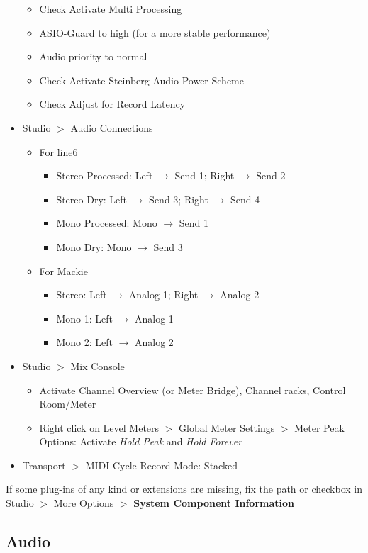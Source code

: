 \documentclass[10pt]{article}
\begin{document}
\begin{itemize}
\begin{itemize}
		\item Check Activate Multi Processing
		\item ASIO-Guard to high (for a more stable performance)
		\item Audio priority to normal
		\item Check Activate Steinberg Audio Power Scheme
		\item Check Adjust for Record Latency
	\end{itemize}
	\item Studio $>$ Audio Connections
	\begin{itemize}
		\item For line6
		\begin{itemize}
			\item Stereo Processed: Left $\rightarrow$ Send 1; Right $\rightarrow$ Send 2
			\item Stereo Dry: Left $\rightarrow$ Send 3; Right $\rightarrow$ Send 4
			\item Mono Processed: Mono $\rightarrow$ Send 1
			\item Mono Dry: Mono $\rightarrow$ Send 3
		\end{itemize}
		\item For Mackie
		\begin{itemize}
			\item Stereo: Left $\rightarrow$ Analog 1; Right $\rightarrow$ Analog 2
			\item Mono 1: Left $\rightarrow$ Analog 1
			\item Mono 2: Left $\rightarrow$ Analog 2
		\end{itemize}
	\end{itemize}
	\item Studio $>$ Mix Console
	\begin{itemize}
		\item Activate Channel Overview (or Meter Bridge), Channel racks, Control Room/Meter
		\item Right click on Level Meters $>$ Global Meter Settings $>$ Meter Peak Options: Activate \textit{Hold Peak} and \textit{Hold Forever}
	\end{itemize}
	\item Transport $>$ MIDI Cycle Record Mode: Stacked
\end{itemize}

If some plug-ins of any kind or extensions are missing, fix the path or checkbox in Studio $>$ More Options $>$ \textbf{System Component Information}

\subsection{Audio}\label{AudioQuality}
\end{document}
